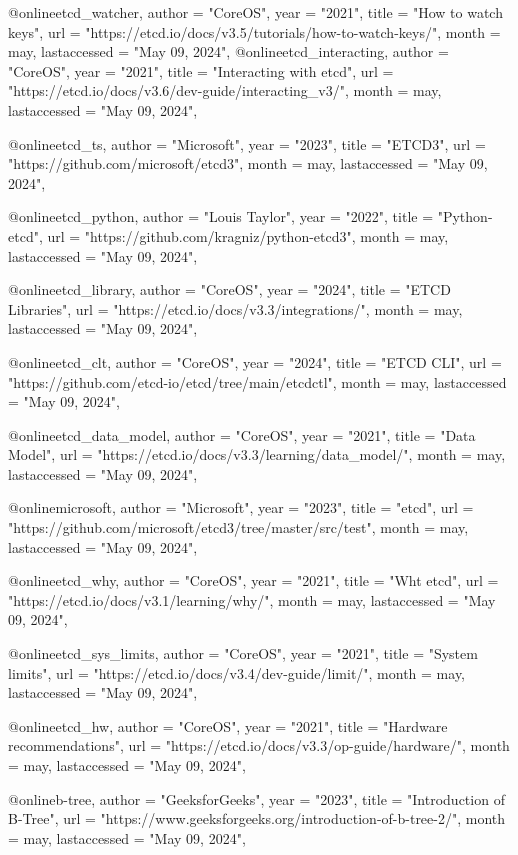 @online{etcd_watcher,
author =       "CoreOS",
year =         "2021",
title =        "How to watch keys",
url =          "https://etcd.io/docs/v3.5/tutorials/how-to-watch-keys/",
month =        may,
lastaccessed = "May 09, 2024",
}
@online{etcd_interacting,
author =       "CoreOS",
year =         "2021",
title =        "Interacting with etcd",
url =          "https://etcd.io/docs/v3.6/dev-guide/interacting_v3/",
month =        may,
lastaccessed = "May 09, 2024",
}

@online{etcd_ts,
author =       "Microsoft",
year =         "2023",
title =        "ETCD3",
url =          "https://github.com/microsoft/etcd3",
month =        may,
lastaccessed = "May 09, 2024",
}

@online{etcd_python,
author =       "Louis Taylor",
year =         "2022",
title =        "Python-etcd",
url =          "https://github.com/kragniz/python-etcd3",
month =        may,
lastaccessed = "May 09, 2024",
}

@online{etcd_library,
author =       "CoreOS",
year =         "2024",
title =        "ETCD Libraries",
url =          "https://etcd.io/docs/v3.3/integrations/",
month =        may,
lastaccessed = "May 09, 2024",
}

@online{etcd_clt,
author =       "CoreOS",
year =         "2024",
title =        "ETCD CLI",
url =          "https://github.com/etcd-io/etcd/tree/main/etcdctl",
month =        may,
lastaccessed = "May 09, 2024",
}

@online{etcd_data_model,
author =       "CoreOS",
year =         "2021",
title =        "Data Model",
url =          "https://etcd.io/docs/v3.3/learning/data_model/",
month =        may,
lastaccessed = "May 09, 2024",
}

@online{microsoft,
author =       "Microsoft",
year =         "2023",
title =        "etcd",
url =          "https://github.com/microsoft/etcd3/tree/master/src/test",
month =        may,
lastaccessed = "May 09, 2024",
}

@online{etcd_why,
author =       "CoreOS",
year =         "2021",
title =        "Wht etcd",
url =          "https://etcd.io/docs/v3.1/learning/why/",
month =        may,
lastaccessed = "May 09, 2024",
}

@online{etcd_sys_limits,
author =       "CoreOS",
year =         "2021",
title =        "System limits",
url =          "https://etcd.io/docs/v3.4/dev-guide/limit/",
month =        may,
lastaccessed = "May 09, 2024",
}

@online{etcd_hw,
author =       "CoreOS",
year =         "2021",
title =        "Hardware recommendations",
url =          "https://etcd.io/docs/v3.3/op-guide/hardware/",
month =        may,
lastaccessed = "May 09, 2024",
}

@online{b-tree,
author =       "GeeksforGeeks",
year =         "2023",
title =        "Introduction of B-Tree",
url =          "https://www.geeksforgeeks.org/introduction-of-b-tree-2/",
month =        may,
lastaccessed = "May 09, 2024",
}
